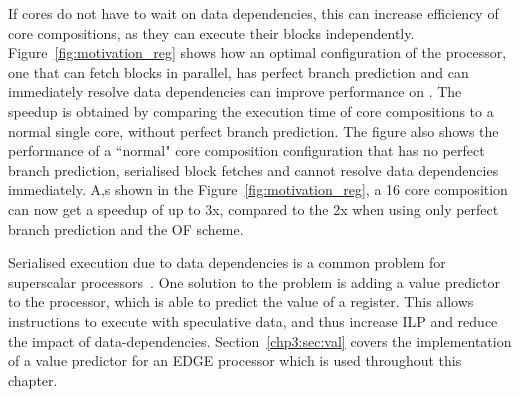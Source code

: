 If cores do not have to wait on data dependencies, this can increase efficiency of core compositions, as they can execute their blocks independently.
Figure~\ref{fig:motivation_reg} shows how an optimal configuration of the processor, one that can fetch blocks in parallel, has perfect branch prediction and can immediately resolve data dependencies can improve performance on .
The speedup is obtained by comparing the execution time of core compositions to a normal single core, without perfect branch prediction.
The figure also shows the performance of a ``normal" core composition configuration that has no perfect branch prediction, serialised block fetches and cannot resolve data dependencies immediately.
A,s shown in the Figure~\ref{fig:motivation_reg}, a 16 core composition can now get a speedup of up to 3x, compared to the 2x when using only perfect branch prediction and the OF scheme.

Serialised execution due to data dependencies is a common problem for superscalar processors~\cite{peraisVTAGE2014}.
One solution to the problem is adding a value predictor to the processor, which is able to predict the value of a register.
This allows instructions to execute with speculative data, and thus increase ILP and reduce the impact of data-dependencies.
Section~\ref{chp3:sec:val} covers the implementation of a value predictor for an EDGE processor which is used throughout this chapter.






